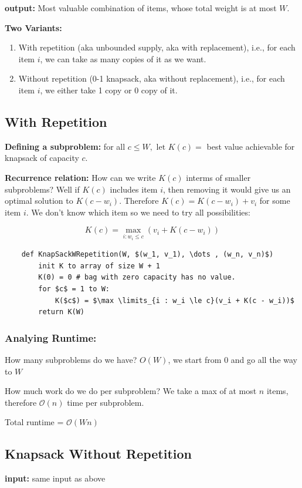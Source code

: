 \documentclass[12pt]{article}
\renewcommand{\O}{\mathcal{O}}
\begin{document}
\textbf{output:} Most valuable combination of items, whose total weight is at most $W$.

\textbf{Two Variants: }
\begin{enumerate}
    \item With repetition (aka unbounded supply, aka with replacement), i.e., for each item $i$, we can take as many copies of it as we want.
    \item Without repetition (0-1 knapsack, aka without replacement), i.e., for each item $i$, we either take 1 copy or 0 copy of it.
\end{enumerate}

\subsection{With Repetition}
\textbf{Defining a subproblem:} for all $c \le W, \text{ let } K(c) = $ best value achievable for knapsack of capacity $c$.

\textbf{Recurrence relation: } How can we write $K(c)$ interms of smaller subproblems? Well if $K(c)$ includes item $i$, then removing it would give us an optimal solution to $K(c - w_i)$. Therefore $K(c) = K(c - w_i) + v_i$ for some item $i$. We don't know which item so we need to try all possibilities:

$$
    K(c) = \max \limits_{i : w_i \le c}(v_i + K(c - w_i))
$$

\begin{lstlisting}
    def KnapSackWRepetition(W, $(w_1, v_1), \dots , (w_n, v_n)$)
        init K to array of size W + 1
        K(0) = 0 # bag with zero capacity has no value.
        for $c$ = 1 to W:
            K($c$) = $\max \limits_{i : w_i \le c}(v_i + K(c - w_i))$
        return K(W)
\end{lstlisting}

\subsubsection{Analying Runtime:}
How many subproblems do we have? $O(W)$, we start from 0 and go all the way to $W$

How much work do we do per subproblem? We take a max of at most $n$ items, therefore $\O(n)$ time per subproblem.

Total runtime = $\O(Wn)$

\subsection{Knapsack Without Repetition}
\textbf{input: } same input as above
\end{document}
